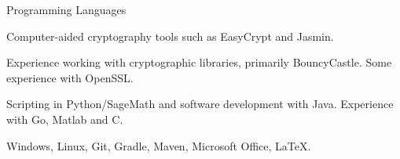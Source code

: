 \begin{cventries}
  \cventry
  {Programming Languages}
  {}
  {}
  {}
  {
    \begin{cvitems}
      \item {Computer-aided cryptography tools such as EasyCrypt and Jasmin.}
      \item {Experience working with cryptographic libraries, primarily BouncyCastle. Some experience with OpenSSL.}
      \item {Scripting in Python/SageMath and software development with Java. Experience with Go, Matlab and C.}
    \end{cvitems}}
  {
    \begin{cvitems}
      \item {Windows, Linux, Git, Gradle, Maven, Microsoft Office, LaTeX.}
    \end{cvitems}
  }
\end{cventries}